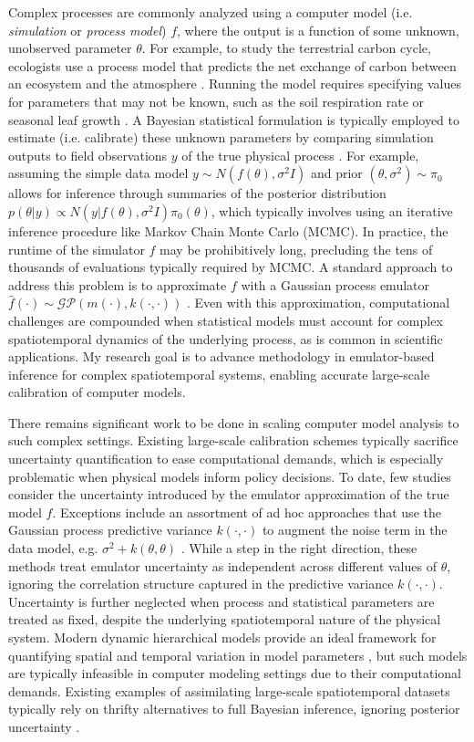 \documentclass[11pt]{article}
\begin{document}
Complex processes are commonly analyzed using a computer model (i.e. \textit{simulation} or \textit{process model}) $f$, where the output is a function of some unknown, unobserved parameter $\theta$.
For example, to study the terrestrial carbon cycle, ecologists use a process model 
that predicts the net exchange of carbon between an ecosystem and the atmosphere \cite{Fer}. Running the model requires specifying values for parameters that 
may not be known, such as the soil respiration rate or seasonal leaf growth \cite{Fer}. A Bayesian statistical formulation is typically employed to estimate (i.e. calibrate) these unknown parameters by comparing simulation outputs to field observations $y$ of the true physical process \cite{Kennedy}. For example, assuming the simple data model $y \sim N(f(\theta), \sigma^2 I)$ and prior $(\theta, \sigma^2) \sim \pi_0$ allows for inference through summaries of the posterior distribution $p(\theta|y) \propto N(y|f(\theta), \sigma^2 I)\pi_0(\theta)$, which typically involves using an iterative inference procedure like Markov Chain Monte Carlo (MCMC). In practice, the runtime of the simulator $f$ may be prohibitively long, precluding the tens of thousands of evaluations typically required by MCMC. A standard approach to address this problem is to approximate $f$ with a Gaussian process emulator $\hat{f}(\cdot) \sim \mathcal{GP}(m(\cdot), k(\cdot, \cdot))$ \cite{Fer, Kennedy, Cleary}. Even with this approximation, computational challenges are compounded when statistical models must account for complex spatiotemporal dynamics of the underlying process, as is common in scientific applications. My research goal is to advance methodology in emulator-based inference for complex spatiotemporal systems, enabling accurate large-scale calibration of computer models.

 There remains significant work to be done in scaling computer model analysis to such complex settings. Existing large-scale calibration schemes typically sacrifice uncertainty quantification to ease computational demands, which is especially problematic when physical models inform policy decisions. To date, few studies consider the uncertainty introduced by the emulator approximation of the true model $f$. Exceptions include an assortment of ad hoc approaches that use the Gaussian process predictive variance $k(\cdot, \cdot)$ to augment the 
 noise term in the data model, e.g. $\sigma^2 + k(\theta, \theta)$ \cite{Fer, Cleary}. While a step in the right direction, these methods treat emulator uncertainty as independent across different values of $\theta$, ignoring the correlation structure captured in the predictive variance $k(\cdot, \cdot)$. Uncertainty is further neglected when process and statistical parameters are treated as fixed, despite the underlying spatiotemporal nature of the physical system. Modern dynamic hierarchical models provide an ideal framework for quantifying spatial and temporal variation in model parameters \cite{Wikle}, but such models are typically infeasible in computer modeling settings due to their computational demands. Existing examples of assimilating large-scale spatiotemporal datasets typically rely on thrifty alternatives to full Bayesian inference, ignoring posterior uncertainty \cite{Sun}.
 
\end{document}
